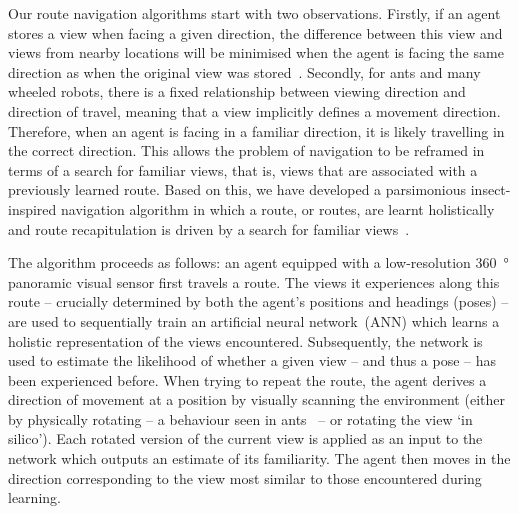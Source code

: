 \documentclass[letterpaper]{article}
\begin{document}
Our route navigation algorithms start with two observations. 
Firstly, if an agent stores a view when facing a given direction, the difference between this view and views from nearby locations will be minimised when the agent is facing the same direction as when the original view was stored~\citep{Zeil2003}. 
Secondly, for ants and many wheeled robots, there is a fixed relationship between viewing direction and direction of travel, meaning that a view implicitly defines a movement direction.
Therefore, when an agent is facing in a familiar direction, it is likely travelling in the correct direction. 
This allows the problem of navigation to be reframed in terms of a search for familiar views, that is, views that are associated with a previously learned route.
Based on this, we have developed a parsimonious insect-inspired navigation algorithm in which a route, or routes, are learnt holistically and route recapitulation is driven by a search for familiar views~\citep{Baddeley2012}.

The algorithm proceeds as follows: an agent equipped with a low-resolution \SI{360}{\degree} panoramic visual sensor first travels a route.
The views it experiences along this route -- crucially determined by both the agent's positions and headings (poses) -- are used to sequentially train an artificial neural network~(ANN) which learns a holistic representation of the views encountered. Subsequently, the network is used to estimate the likelihood of whether a given view -- and thus a pose -- has been experienced before.
When trying to repeat the route, the agent derives a direction of movement at a position by visually scanning the environment (either by physically rotating -- a behaviour seen in ants~\citep{Wystrach2014} -- or rotating the view `in silico').
Each rotated version of the current view is applied as an input to the network which outputs an estimate of its familiarity.
The agent then moves in the direction corresponding to the view most similar to those encountered during learning.
\end{document}
